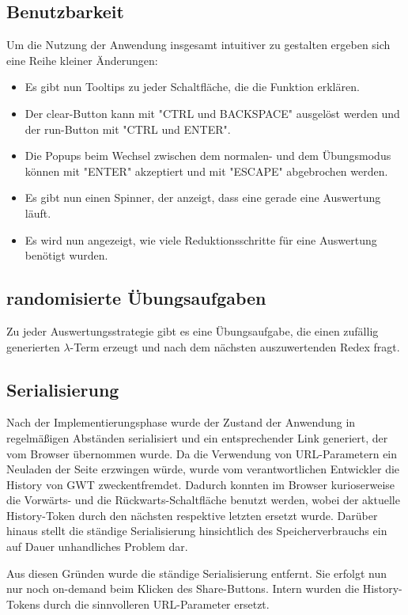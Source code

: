 \documentclass[parskip=full,11pt,openany]{scrreprt}
\begin{document}
\subsection{Benutzbarkeit}
Um die Nutzung der Anwendung insgesamt intuitiver zu gestalten ergeben sich eine Reihe kleiner Änderungen:

\begin{itemize}
\item Es gibt nun Tooltips zu jeder Schaltfläche, die die Funktion erklären.
\item Der clear-Button kann mit "CTRL und BACKSPACE" ausgelöst werden und der run-Button mit "CTRL und ENTER".
\item Die Popups beim Wechsel zwischen dem normalen- und dem Übungsmodus können mit "ENTER" akzeptiert und mit
"ESCAPE" abgebrochen werden.
\item Es gibt nun einen Spinner, der anzeigt, dass eine gerade eine Auswertung läuft.
\item Es wird nun angezeigt, wie viele Reduktionsschritte für eine Auswertung benötigt wurden.
\end{itemize}

\subsection{randomisierte Übungsaufgaben}
Zu jeder Auswertungsstrategie gibt es eine Übungsaufgabe, die einen zufällig generierten $\lambda$-Term erzeugt
und nach dem nächsten auszuwertenden Redex fragt.

\subsection{Serialisierung}
Nach der Implementierungsphase wurde der Zustand der Anwendung in regelmäßigen Abständen serialisiert und 
ein entsprechender Link generiert, der vom Browser übernommen wurde.
Da die Verwendung von URL-Parametern ein Neuladen der Seite erzwingen würde, wurde vom verantwortlichen 
Entwickler die History von GWT zweckentfremdet.
Dadurch konnten im Browser kurioserweise die Vorwärts- und die Rückwarts-Schaltfläche benutzt werden, wobei
der aktuelle History-Token durch den nächsten respektive letzten ersetzt wurde.
Darüber hinaus stellt die ständige Serialisierung hinsichtlich des Speicherverbrauchs ein auf Dauer unhandliches
Problem dar.

Aus diesen Gründen wurde die ständige Serialisierung entfernt. Sie erfolgt nun nur noch on-demand beim Klicken
des Share-Buttons. Intern wurden die History-Tokens durch die sinnvolleren URL-Parameter ersetzt.
\end{document}
